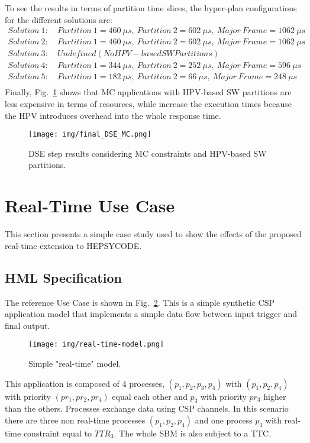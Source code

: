 % 
To see the results in terms of partition time slices, the hyper-plan configurations for the different solutions are: 
%
\footnotesize
\begin{align*}
    Solution \ 1: & \ Partition \ 1 = 460 \ \mu s, \ Partition \ 2 = 602 \ \mu s, \ Major \ Frame = 1062 \ \mu s  \\
    Solution \ 2: & \ Partition \ 1 = 460 \ \mu s, \ Partition \ 2 = 602 \ \mu s, \ Major \ Frame = 1062 \ \mu s  \\
    Solution \ 3: & \ Undefined (No HPV-based SW Partitions) \\
    Solution \ 4: & \ Partition \ 1 = 344 \ \mu s, \ Partition \ 2 = 252 \ \mu s, \ Major \ Frame = 596 \ \mu s  \\
    Solution \ 5: & \ Partition \ 1 = 182 \ \mu s, \ Partition \ 2 = 66 \ \mu s, \ Major \ Frame = 248 \ \mu s  \\
\end{align*}
\normalsize
%
Finally, Fig.~\ref{dse_small_02_MC_HPV} shows that MC applications with HPV-based SW partitions are less expensive in terms of resources, while increase the execution times because the HPV introduces overhead into the whole response time.
%
\begin{figure}[htbp]
	\centerline{\texttt{[image: img/final\_DSE\_MC.png]}}
	\caption{DSE step results considering MC constraints and HPV-based SW partitions.}
	\label{dse_small_02_MC_HPV}
\end{figure}
%
%
\section{Real-Time Use Case}\label{real_time_use_case_example}
%
This section presents a simple case study used to show the effects of the proposed real-time extension to HEPSYCODE.
%
\subsection{HML Specification}
%
The reference Use Case is shown in Fig.~\ref{firfirgcd_rt_exaple}. This is a simple synthetic CSP application model that implements a simple data flow between input trigger and final output. \par
%
\begin{figure}[htbp]
	\centerline{\texttt{[image: img/real-time-model.png]}}
	\caption{Simple "real-time" model.}
	\label{firfirgcd_rt_exaple}
\end{figure}
%
This application is composed of 4 processes, $(p_1, p_2, p_3, p_4)$ with $(p_1, p_2, p_4)$ with priority $(pr_1, pr_2, pr_4)$ equal each other and $p_3$ with priority $pr_3$ higher than the others. Processes exchange data using CSP channels. In this scenario there are three non real-time processes $(p_1, p_2, p_4)$ and one process $p_3$ with real-time constraint equal to $TTR_3$. The whole SBM is also subject to a TTC. 
%
